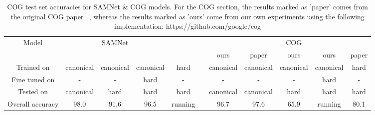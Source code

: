 \begin{table}[t]
	\tiny
	
	\caption{COG test set accuracies for  SAMNet \& COG models. For the COG section, the results marked as 'paper' comes from the original COG paper ~\cite{yang2018dataset}, whereas the results marked as 'ours' come from our own experiments using the following implementation: https://github.com/google/cog }
	
	\centering
	\begin{tabular}{ccccccccccc}
		\toprule
		Model & & SAMNet & && &&& COG& \\
		\cmidrule{2-5} \cmidrule{7-11} 
		&&&&&& ours & paper & ours & ours & paper\\
		\cmidrule{7-9} \cmidrule{10-11}
		Trained on       & canonical & canonical & canonical & hard &            & canonical &  canonical  & canonical  & canonical & hard \\ 
		Fine tuned on  & - & - & hard  & - &           &- & -   & - & hard & - \\ 
		Tested on        & canonical & hard & hard & hard &           & canonical  &  canonical  & hard & hard & hard  \\ 
		\midrule
		
		Overall accuracy & 98.0 & 91.6 & 96.5  & running &           & 96.7 & 97.6  & 65.9 & running& 80.1 \\ 
		
		\midrule 
		

\end{tabular}
\end{table}

